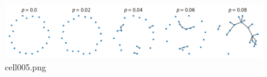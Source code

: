 \begin{figure}[ht]
	\centering
	\includegraphics[scale=0.8, max width=\linewidth]{./fig/appendix/graph-theory-network-model/cell005.png}
	\caption{cell005.png}
	\label{cell005.png}
\end{figure}